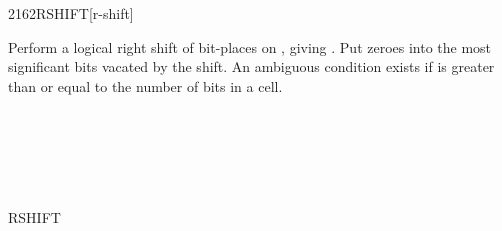\begin{worddef}{2162}{RSHIFT}[r-shift]
\item {}

	Perform a logical right shift of  bit-places on
	, giving . Put zeroes into the most
	significant bits vacated by the shift. An ambiguous condition
	exists if  is greater than or equal to the number of
	bits in a cell.

	\begin{testing} %
		 \\
		 \\
		 \\
		 \\
								\tab[7]   \\
		 \tab[1]  RSHIFT  \\
	\end{testing}
\end{worddef}

